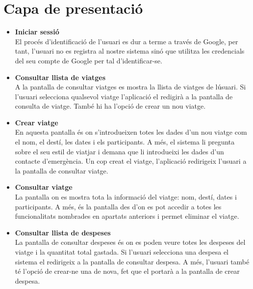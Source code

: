 \section{Capa de presentació}
\begin{itemize}

\item[]{\textbf{Iniciar sessió}}\\
El procés d'identificació de l'usuari es dur a terme a través de Google, per tant, l'usuari no es registra al nostre sistema sinó que utilitza les credencials del seu compte de Google per tal d'identificar-se.\\

\item[]{\textbf{Consultar llista de viatges}}\\
A la pantalla de consultar viatges es mostra la llista de viatges de lúsuari. Si l'usuari selecciona qualsevol viatge l'aplicació el redigirà a la pantalla de consulta de viatge. També hi ha l'opció de crear un nou viatge.\\

\item[]{\textbf{Crear viatge}}\\
En aquesta pantalla és on s'introdueixen totes les dades d'un nou viatge com el nom, el destí, les dates i els participants. A més, el sistema li pregunta sobre el seu estil de viatjar i demana que li introdueixi les dades d'un contacte d'emergència. Un cop creat el viatge, l'aplicació redirigeix l'usuari a la pantalla de consultar viatge.\\

\item[]{\textbf{Consultar viatge}}\\
La pantalla on es mostra tota la informació del viatge: nom, destí, dates i participants. A més, és la pantalla des d'on es pot accedir a totes les funcionalitats nombrades en apartats anteriors i permet eliminar el viatge.\\

\item[]{\textbf{Consultar llista de despeses}}\\
La pantalla de consultar despeses és on es poden veure totes les despeses del viatge i la quantitat total gastada. Si l'usuari selecciona una despesa el sistema el redirigeix a la pantalla de consultar despesa. A més, l'usuari també té l'opció de crear-ne una de nova, fet que el portarà a la pantalla de crear despesa.\\


\end{itemize}
